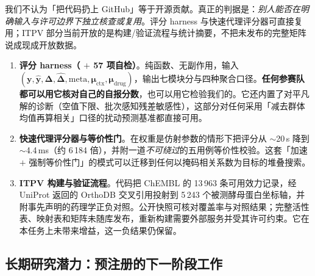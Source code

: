 我们不认为「把代码扔上 GitHub」等于开源贡献。真正的判据是：\emph{别人能否在明确输入与许可边界下独立核查或复用}。评分 harness 与快速代理评分器可直接复用；ITPV 部分当前开放的是构建/验证流程与统计摘要，不把未发布的完整矩阵说成现成开放数据。

\begin{enumerate}
\item \textbf{评分 harness（ $+$ 57 项自检）}。纯函数、无副作用，输入 $(\bm{y},\hat{\bm{y}},\bm{\Delta},\hat{\bm{\Delta}},\text{meta},\bm{\mu}_{\text{ctx}},\bm{\mu}_{\text{drug}})$，输出七模块分与四种聚合口径。\textbf{任何参赛队都可以用它核对自己的自报分数}，也可以用它检验我们的。它还内置了对平凡解的诊断（空值下限、批次感知残差敏感性），这部分对任何采用「减去群体均值再算相关」口径的扰动预测基准都直接可用。
\item \textbf{快速代理评分器与等价性门}。在权重是仿射参数的情形下把评分从 $\sim$20\,s 降到 $\sim$4.4\,ms（约 6\,184 倍），并附一道\emph{不可绕过}的五用例等价性校验。这套「加速 $+$ 强制等价性门」的模式可以迁移到任何以掩码相关系数为目标的堆叠搜索。
\item \textbf{ITPV 构建与验证流程}。代码把 ChEMBL 的 13\,963 条可用效力记录，经 UniProt 返回的 OrthoDB 交叉引用投射到 5\,243 个被测酵母蛋白坐标轴，并附事先声明的药理学正负对照。公开快照可核对覆盖率与对照结果；完整活性表、映射表和矩阵未随库发布，重新构建需要外部服务并受其许可约束。它在本任务上未带来增益，这一负结果仍保留。
\end{enumerate}

\subsection{长期研究潜力：预注册的下一阶段工作}


